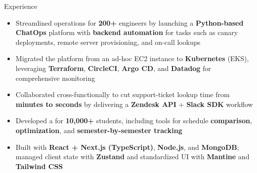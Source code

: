 \documentclass{resume}
\begin{document}
\introduction[
    fullname={Declan Blanchard},
    email={declanblanc@gmail.com},
    linkedin={linkedin.com/in/declanblanc},
    github={github.com/declanblanc}
]



\begin{experienceSection}{Experience}
    
    \experienceItem[
        company={\link{https://www.patreon.com/}{Patreon}},
        location={New York, NY},
        position={Incoming Software Engineer},
        duration={June 2026}
    ]
    \experienceSubItem[
        position={Software Engineer Intern},
        duration={May 2025 - August 2025}
    ]
    \begin{itemize}[itemsep=-6pt, leftmargin=2em, rightmargin=0.8em, before=\raggedright, after=\normalfont]
        \item Streamlined operations for \textbf{200+} engineers by launching a \textbf{Python-based ChatOps} platform with \textbf{backend automation} for tasks such as canary deployments, remote server provisioning, and on-call lookups
       \item Migrated the platform from an ad-hoc EC2 instance to \textbf{Kubernetes} (EKS), leveraging \textbf{Terraform}, \textbf{CircleCI}, \textbf{Argo CD}, and \textbf{Datadog} for comprehensive monitoring 
        \item Collaborated cross-functionally to cut support-ticket lookup time from \textbf{minutes to seconds} by delivering a \textbf{Zendesk API} + \textbf{Slack SDK} workflow
    \end{itemize}

    \experienceItem[
        company={New Jersey Institute of Technology},
        location={Newark, NJ},
        position={Full Stack Developer},
        duration={January 2025 - May 2025}
    ]
    \begin{itemize}[itemsep=-6pt, leftmargin=2em, rightmargin=0.8em, before=\raggedright, after=\normalfont]
        \item Developed a  for \textbf{10,000+} students, including tools for schedule \textbf{comparison}, \textbf{optimization}, and \textbf{semester-by-semester tracking}
        \item Built with \textbf{React + Next.js (TypeScript)}, \textbf{Node.js}, and \textbf{MongoDB}; managed client state with \textbf{Zustand} and standardized UI with \textbf{Mantine} and \textbf{Tailwind CSS}
    \end{itemize}


\end{experienceSection}
\end{document}
